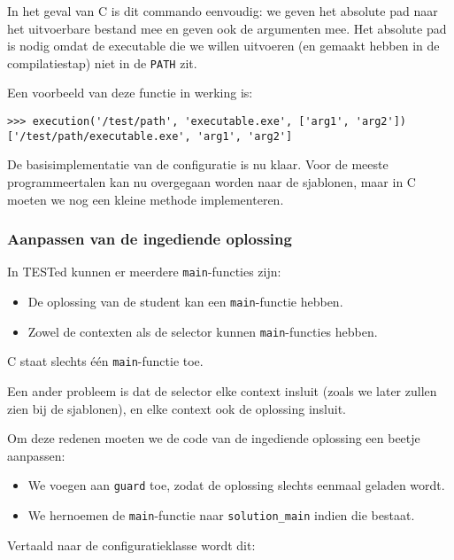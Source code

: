 In het geval van C is dit commando eenvoudig: we geven het absolute pad naar het uitvoerbare bestand mee en geven ook de argumenten mee.
Het absolute pad is nodig omdat de executable die we willen uitvoeren (en gemaakt hebben in de compilatiestap) niet in de \texttt{PATH} zit.

Een voorbeeld van deze functie in werking is:

\begin{verbatim}
>>> execution('/test/path', 'executable.exe', ['arg1', 'arg2'])
['/test/path/executable.exe', 'arg1', 'arg2']
\end{verbatim}

De basisimplementatie van de configuratie is nu klaar.
Voor de meeste programmeertalen kan nu overgegaan worden naar de sjablonen, maar in C moeten we nog een kleine methode implementeren.

\subsubsection{Aanpassen van de ingediende oplossing}

In TESTed kunnen er meerdere \texttt{main}-functies zijn:

\begin{itemize}
    \item De oplossing van de student kan een \texttt{main}-functie hebben.
    \item Zowel de contexten als de selector kunnen \texttt{main}-functies hebben.
\end{itemize}

C staat slechts één \texttt{main}-functie toe.

Een ander probleem is dat de selector elke context insluit (zoals we later zullen zien bij de sjablonen), en elke context ook de oplossing insluit.

Om deze redenen moeten we de code van de ingediende oplossing een beetje aanpassen:

\begin{itemize}
    \item We voegen aan \texttt{guard} toe, zodat de oplossing slechts eenmaal geladen wordt.
    \item We hernoemen de \texttt{main}-functie naar \texttt{solution\_main} indien die bestaat.
\end{itemize}

Vertaald naar de configuratieklasse wordt dit:

\inputminted[firstline=23,lastline=29,gobble=4]{python}{sources/c-config.py}

